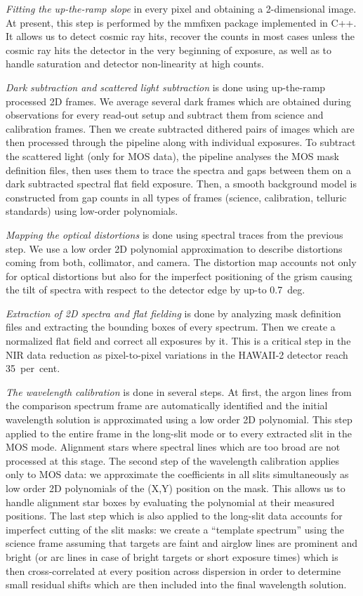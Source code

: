  \emph{Fitting the up-the-ramp slope} in every pixel and obtaining a 2-dimensional image. At present, this step is performed by the {\sc mmfixen} package implemented in {\sc C++}. It allows us to detect cosmic ray hits, recover the counts in most cases unless the cosmic ray hits the detector in the very beginning of exposure, as well as to handle saturation and detector non-linearity at high counts.

 \emph{Dark subtraction and scattered light subtraction} is done using up-the-ramp processed 2D frames.  We average several dark frames which are obtained during observations for every read-out setup and subtract them from science and calibration frames.  Then we create subtracted dithered pairs of images which are then processed through the pipeline along with individual exposures.  To subtract the scattered light (only for MOS data), the pipeline analyses the MOS mask definition files, then uses them to trace the spectra and gaps between them on a dark subtracted spectral flat field exposure.  Then, a smooth background model is constructed from gap counts in all types of frames (science, calibration, telluric standards) using low-order polynomials.

 \emph{Mapping the optical distortions} is done using spectral traces from the previous step.  We use a low order 2D polynomial approximation to describe distortions coming from both, collimator, and camera. The distortion map accounts not only for optical distortions but also for the imperfect positioning of the grism causing the tilt of spectra with respect to the detector edge by up-to 0.7~deg.

 \emph{Extraction of 2D spectra and flat fielding} is done by analyzing mask definition files and extracting the bounding boxes of every spectrum.  Then we create a normalized flat field and correct all exposures by it.  This is a critical step in the NIR data reduction as pixel-to-pixel variations in the HAWAII-2 detector reach 35~per~cent.

 \emph{The wavelength calibration} is done in several steps. At first, the argon lines from the comparison spectrum frame are automatically identified and the initial wavelength solution is approximated using a low order 2D polynomial.  This step applied to the entire frame in the long-slit mode or to every extracted slit in the MOS mode.  Alignment stars where spectral lines which are too broad are not processed at this stage.  The second step of the wavelength calibration applies only to MOS data: we approximate the coefficients in all slits simultaneously as low order 2D polynomials of the (X,Y) position on the mask.  This allows us to handle alignment star boxes by evaluating the polynomial at their measured positions.  The last step which is also applied to the long-slit data accounts for imperfect cutting of the slit masks: we create a ``template spectrum'' using the science frame assuming that targets are faint and airglow lines are prominent and bright (or arc lines in case of bright targets or short exposure times) which is then cross-correlated at every position across dispersion in order to determine small residual shifts which are then included into the final wavelength solution.

